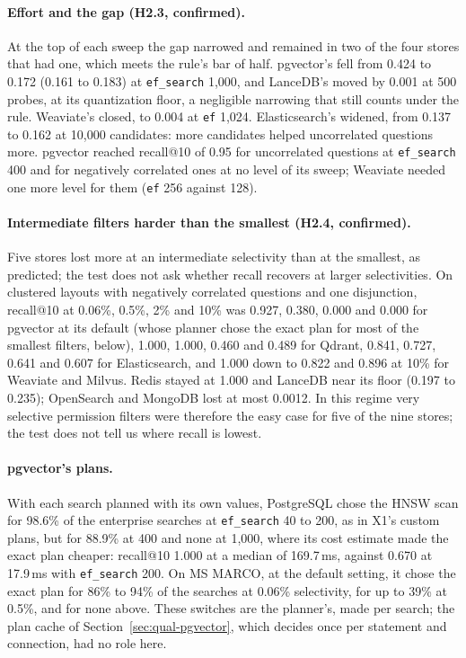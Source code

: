 \paragraph{Effort and the gap (H2.3, confirmed).}
At the top of each sweep the gap narrowed and remained in two of the four stores that had one, which meets the rule's bar of half. pgvector's fell from 0.424 to 0.172 (0.161 to 0.183) at \texttt{ef\_search} 1,000, and
LanceDB's moved by 0.001 at 500 probes, at its quantization floor, a negligible narrowing that still counts under the rule. Weaviate's closed, to 0.004 at
\texttt{ef} 1,024. Elasticsearch's widened, from 0.137 to 0.162 at 10,000 candidates: more candidates
helped uncorrelated questions more. pgvector reached recall@10 of 0.95 for uncorrelated questions at
\texttt{ef\_search} 400 and for negatively correlated ones at no level of its sweep; Weaviate needed one
more level for them (\texttt{ef} 256 against 128).

\paragraph{Intermediate filters harder than the smallest (H2.4, confirmed).}
Five stores lost more at an intermediate selectivity than at the smallest, as predicted; the test
does not ask whether recall recovers at larger selectivities. On clustered
layouts with negatively correlated questions and one disjunction, recall@10 at 0.06\%, 0.5\%, 2\% and
10\% was 0.927, 0.380, 0.000 and 0.000 for pgvector at its default (whose planner chose the exact
plan for most of the smallest filters, below), 1.000, 1.000, 0.460 and 0.489 for Qdrant, 0.841,
0.727, 0.641 and 0.607 for Elasticsearch, and 1.000 down to 0.822 and 0.896 at 10\% for Weaviate and
Milvus. Redis stayed at 1.000 and LanceDB near its floor (0.197 to 0.235); OpenSearch and MongoDB lost
at most 0.0012. In this regime very selective permission filters were therefore the easy case for five of the nine stores; the test does not tell us where recall is lowest.

\paragraph{pgvector's plans.}
With each search planned with its own values, PostgreSQL chose the HNSW scan for 98.6\% of the
enterprise searches at \texttt{ef\_search} 40 to 200, as in X1's custom plans, but for 88.9\% at 400
and none at 1,000, where its cost estimate made the exact plan cheaper: recall@10 1.000 at a median
of 169.7\,ms, against 0.670 at 17.9\,ms with \texttt{ef\_search} 200. On MS MARCO, at the default
setting, it chose the exact plan for 86\% to 94\% of the searches at 0.06\% selectivity, for up to
39\% at 0.5\%, and for none above.
These switches are the planner's, made per search; the plan cache of Section~\ref{sec:qual-pgvector},
which decides once per statement and connection, had no role here.

